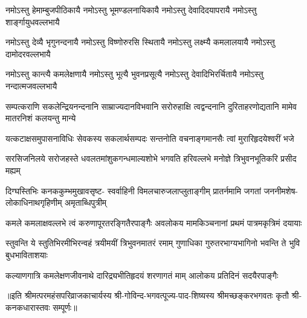 \fourlineindentedshloka
{नमोऽस्तु हेमाम्बुजपीठिकायै}
{नमोऽस्तु भूमण्डलनायिकायै}
{नमोऽस्तु देवादिदयापरायै}
{नमोऽस्तु शार्ङ्गायुधवल्लभायै}

\fourlineindentedshloka
{नमोऽस्तु देव्यै भृगुनन्दनायै}
{नमोऽस्तु विष्णोरुरसि स्थितायै}
{नमोऽस्तु लक्ष्म्यै कमलालयायै}
{नमोऽस्तु दामोदरवल्लभायै}

\fourlineindentedshloka
{नमोऽस्तु कान्त्यै कमलेक्षणायै}
{नमोऽस्तु भूत्यै भुवनप्रसूत्यै}
{नमोऽस्तु देवादिभिरर्चितायै}
{नमोऽस्तु नन्दात्मजवल्लभायै}

\fourlineindentedshloka
{सम्पत्कराणि सकलेन्द्रियनन्दनानि}
{साम्राज्यदानविभवानि सरोरुहाक्षि}
{त्वद्वन्दनानि दुरिताहरणोद्यतानि}
{मामेव मातरनिशं कलयन्तु मान्ये}

\fourlineindentedshloka
{यत्कटाक्षसमुपासनाविधिः}
{सेवकस्य सकलार्थसम्पदः}
{सन्तनोति वचनाङ्गमानसैः}
{त्वां मुरारिहृदयेश्वरीं भजे}

\fourlineindentedshloka
{सरसिजनिलये सरोजहस्ते}
{धवलतमांशुकगन्धमाल्यशोभे}
{भगवति हरिवल्लभे मनोज्ञे}
{त्रिभुवनभूतिकरि प्रसीद मह्यम्}

\fourlineindentedshloka
{दिग्घस्तिभिः कनककुम्भमुखावसृष्ट-}
{स्वर्वाहिनी विमलचारुजलाप्लुताङ्गीम्}
{प्रातर्नमामि जगतां जननीमशेष-}
{लोकाधिनाथगृहिणीम् अमृताब्धिपुत्रीम्}

\fourlineindentedshloka
{कमले कमलाक्षवल्लभे त्वं}
{करुणापूरतरङ्गितैरपाङ्गैः}
{अवलोकय मामकिञ्चनानां}
{प्रथमं पात्रमकृत्रिमं दयायाः}

\fourlineindentedshloka
{स्तुवन्ति ये स्तुतिभिरमीभिरन्वहं}
{त्रयीमयीं त्रिभुवनमातरं रमाम्}
{गुणाधिका गुरुतरभाग्यभागिनो}
{भवन्ति ते भुवि बुधभाविताशयाः}

{कल्याणगात्रि कमलेक्षणजीवनाथे}
{दारिद्र्यभीतिहृदयं शरणागतं माम्}
{आलोकय प्रतिदिनं सदयैरपाङ्गैः}

॥इति श्रीमत्परमहंसपरिव्राजकाचार्यस्य श्री-गोविन्द-भगवत्पूज्य-पाद-शिष्यस्य
श्रीमच्छङ्करभगवतः कृतौ श्री-कनकधारास्तवः सम्पूर्णः॥
